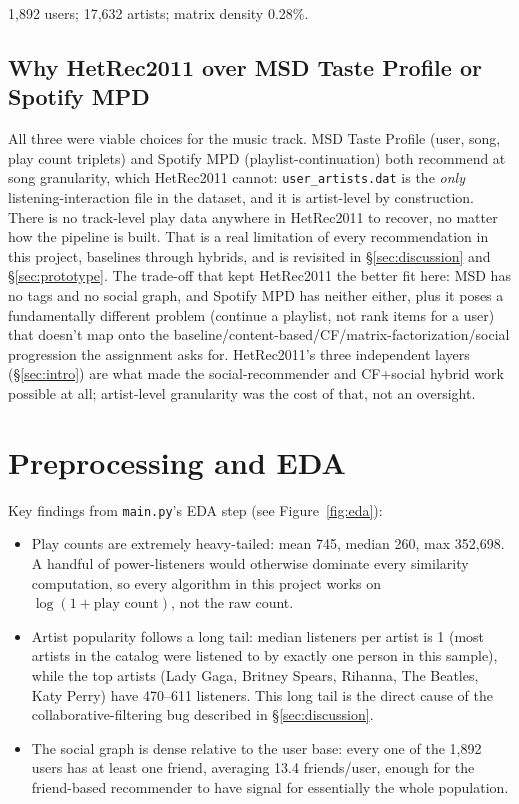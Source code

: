 \documentclass[11pt,a4paper]{article}
\newcommand{\code}[1]{\texttt{#1}}
\newcommand{\secref}[1]{\S\ref{#1}}
\begin{document}
1{,}892 users; 17{,}632 artists; matrix density 0.28\%.

\subsection{Why HetRec2011 over MSD Taste Profile or Spotify MPD}

All three were viable choices for the music track. MSD Taste Profile (user, song, play count triplets) and Spotify MPD (playlist-continuation) both recommend at song granularity, which HetRec2011 cannot: \code{user\_artists.dat} is the \emph{only} listening-interaction file in the dataset, and it is artist-level by construction. There is no track-level play data anywhere in HetRec2011 to recover, no matter how the pipeline is built. That is a real limitation of every recommendation in this project, baselines through hybrids, and is revisited in \secref{sec:discussion} and \secref{sec:prototype}. The trade-off that kept HetRec2011 the better fit here: MSD has no tags and no social graph, and Spotify MPD has neither either, plus it poses a fundamentally different problem (continue a playlist, not rank items for a user) that doesn't map onto the baseline/content-based/CF/matrix-factorization/social progression the assignment asks for. HetRec2011's three independent layers (\secref{sec:intro}) are what made the social-recommender and CF+social hybrid work possible at all; artist-level granularity was the cost of that, not an oversight.

\section{Preprocessing and EDA}
\label{sec:eda}

Key findings from \code{main.py}'s EDA step (see Figure~\ref{fig:eda}):

\begin{itemize}[leftmargin=*]
  \item Play counts are extremely heavy-tailed: mean 745, median 260, max 352{,}698. A handful of power-listeners would otherwise dominate every similarity computation, so every algorithm in this project works on $\log(1+\text{play count})$, not the raw count.
  \item Artist popularity follows a long tail: median listeners per artist is 1 (most artists in the catalog were listened to by exactly one person in this sample), while the top artists (Lady Gaga, Britney Spears, Rihanna, The Beatles, Katy Perry) have 470--611 listeners. This long tail is the direct cause of the collaborative-filtering bug described in \secref{sec:discussion}.
  \item The social graph is dense relative to the user base: every one of the 1{,}892 users has at least one friend, averaging 13.4 friends/user, enough for the friend-based recommender to have signal for essentially the whole population.
\end{itemize}
\end{document}
